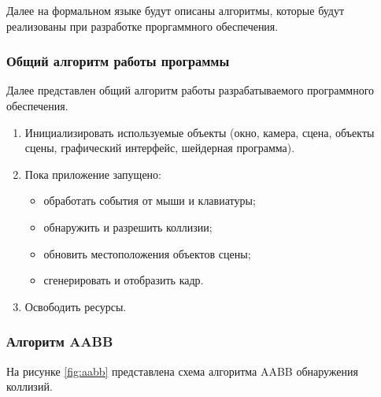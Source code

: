 Далее на формальном языке будут описаны алгоритмы, которые будут реализованы при разработке проргаммного обеспечения.

\subsubsection{Общий алгоритм работы программы}

Далее представлен общий алгоритм работы разрабатываемого программного обеспечения.

\begin{enumerate}
    \item Инициализировать используемые объекты (окно, камера, сцена, объекты сцены, графический интерфейс, шейдерная программа).
    \item Пока приложение запущено:
        \begin{itemize}
            \item обработать события от мыши и клавиатуры;
            \item обнаружить и разрешить коллизии;
            \item обновить местоположения объектов сцены;
            \item сгенерировать и отобразить кадр.
        \end{itemize}
    \item Освободить ресурсы.
\end{enumerate}


\subsubsection{Алгоритм AABB}

На рисунке \ref{fig:aabb} представлена схема алгоритма AABB обнаружения коллизий.

